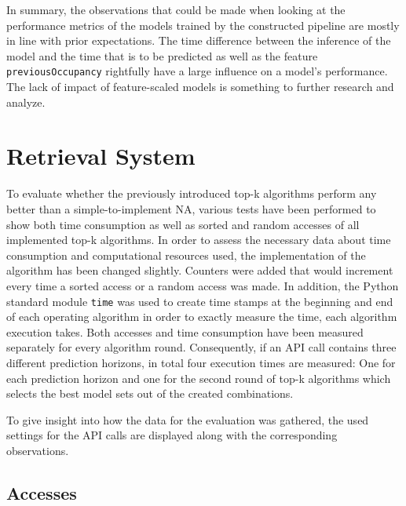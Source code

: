   In summary, the observations that could be made when looking at the performance metrics of the models trained by the constructed pipeline are mostly in line with prior expectations. The time difference between the inference of the model and the time that is to be predicted as well as the feature \texttt{previousOccupancy} rightfully have a large influence on a model's performance. The lack of impact of feature-scaled models is something to further research and analyze.
  
  
  
  \section{Retrieval System}

To evaluate whether the previously introduced top-k algorithms perform any better than a simple-to-implement NA, various tests have been performed to show both time consumption as well as sorted and random accesses of all implemented top-k algorithms. In order to assess the necessary data about time consumption and computational resources used, the implementation of the algorithm has been changed slightly. Counters were added that would increment every time a sorted access or a random access was made. In addition, the Python standard module \texttt{time} was used to create time stamps at the beginning and end of each operating algorithm in order to exactly measure the time, each algorithm execution takes. Both accesses and time consumption have been measured separately for every algorithm round. Consequently, if an API call contains three different prediction horizons, in total four execution times are measured: One for each prediction horizon and one for the second round of top-k algorithms which selects the best model sets out of the created combinations. 

To give insight into how the data for the evaluation was gathered, the used settings for the API calls are displayed along with the corresponding observations. 



\subsection{Accesses}

